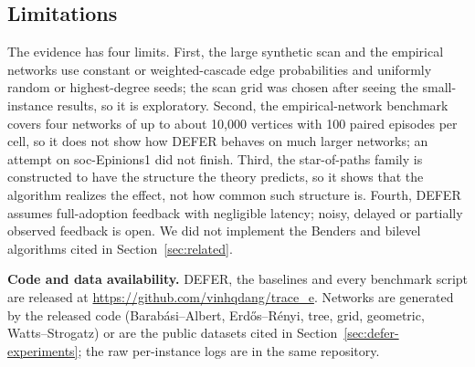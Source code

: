 \documentclass[11pt]{article}
\theoremstyle{definition}
\theoremstyle{remark}
\begin{document}
\subsection{Limitations}\label{sec:conclusion}

The evidence has four limits. First, the large synthetic scan and the empirical networks use constant or weighted-cascade edge probabilities and uniformly random or highest-degree seeds; the scan grid was chosen after seeing the small-instance results, so it is exploratory. Second, the empirical-network benchmark covers four networks of up to about 10,000 vertices with 100 paired episodes per cell, so it does not show how DEFER behaves on much larger networks; an attempt on soc-Epinions1 did not finish. Third, the star-of-paths family is constructed to have the structure the theory predicts, so it shows that the algorithm realizes the effect, not how common such structure is. Fourth, DEFER assumes full-adoption feedback with negligible latency; noisy, delayed or partially observed feedback is open. We did not implement the Benders and bilevel algorithms cited in Section~\ref{sec:related}.

\textbf{Code and data availability.} DEFER, the baselines and every benchmark script are released at \url{https://github.com/vinhqdang/trace_e}. Networks are generated by the released code (Barab\'asi--Albert, Erd\H{o}s--R\'enyi, tree, grid, geometric, Watts--Strogatz) or are the public datasets cited in Section~\ref{sec:defer-experiments}; the raw per-instance logs are in the same repository.
\end{document}
